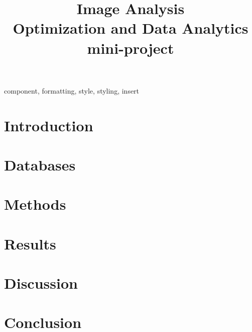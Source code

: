 \documentclass[conference]{IEEEtran}
\begin{document}
\title{Image Analysis\\
{\footnotesize Optimization and Data Analytics mini-project}}

\author{
}

\maketitle

\begin{abstract}
\end{abstract}

\begin{IEEEkeywords}
component, formatting, style, styling, insert
\end{IEEEkeywords}

\section{Introduction}


\section{Databases}


\section{Methods}


\section{Results}


\section{Discussion}


\section{Conclusion}


\onecolumn
\newpage

\onecolumn
\printbibliography

\newpage
\listoftodos[Notes]
\end{document}
